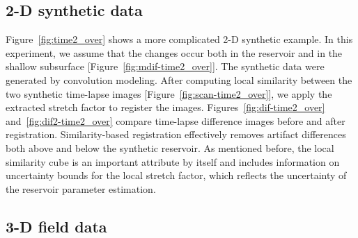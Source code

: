 \subsection{2-D synthetic data} 
 


Figure~\ref{fig:time2_over} shows a more complicated 2-D synthetic
example. In this experiment, we assume that the changes occur both in
the reservoir and in the shallow subsurface
[Figure~\ref{fig:mdif-time2_over}]. The synthetic data were generated
by convolution modeling. After computing local similarity between the
two synthetic time-lapse images [Figure~\ref{fig:scan-time2_over}], we
apply the extracted stretch factor to register the images.
Figures~\ref{fig:dif-time2_over} and~\ref{fig:dif2-time2_over} compare
time-lapse difference images before and after
registration. Similarity-based registration effectively removes
artifact differences both above and below the synthetic reservoir. As
mentioned before, the local similarity cube is an important attribute
by itself and includes information on uncertainty bounds for the local
stretch factor, which reflects the uncertainty of the reservoir
parameter estimation.

\subsection{3-D field data}



